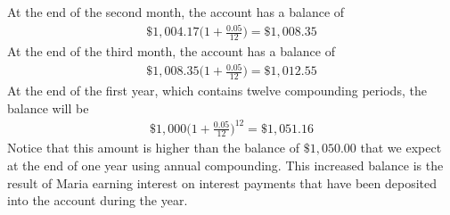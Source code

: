 \documentclass[10pt,]{book}
\theoremstyle{plain}
\theoremstyle{definition}
\theoremstyle{definition}
\theoremstyle{definition}
\numberwithin{equation}{section}
\begin{document}
\hypertarget{p-200}{}%
At the end of the second month, the account has a balance of%
%
\begin{gather*}
\$1,004.17\bigg(1 + \frac{0.05}{12}\bigg) = \$1,008.35
\end{gather*}
\hypertarget{p-201}{}%
At the end of the third month, the account has a balance of%
%
\begin{gather*}
\$1,008.35 \bigg(1 + \frac{0.05}{12}\bigg) = \$1,012.55
\end{gather*}
\hypertarget{p-202}{}%
At the end of the first year, which contains twelve compounding periods, the balance will be%
%
\begin{gather*}
\$1,000 \bigg(1 + \frac{0.05}{12}\bigg)^{12} = \$1,051.16
\end{gather*}
\hypertarget{p-203}{}%
Notice that this amount is higher than the balance of \(\$1,050.00\) that we expect at the end of one year using annual compounding. This increased balance is the result of Maria earning interest on interest payments that have been deposited into the account during the year.%
\end{document}
